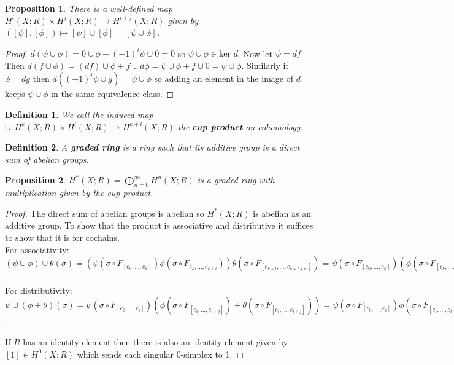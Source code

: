 \documentclass{report}
\newtheorem{definition}{Definition}
\newtheorem{proposition}{Proposition}
\begin{document}
\begin{proposition}
There is a well-defined map $H^i(X;R)\times H^j(X;R)\to H^{i+j}(X;R)$ given by $([\psi],[\phi])\mapsto [\psi]\cup [\phi]=[\psi\cup\phi]$.
\end{proposition}
\begin{proof}
$d(\psi\cup\phi)=0\cup\phi+(-1)^i\psi\cup 0=0$ so $\psi\cup\phi \in \text{ker }d$.
Now let $\psi=df$. Then $d(f\cup\phi)=(df)\cup\phi\pm f\cup d\phi=\psi\cup\phi+f\cup0=\psi\cup\phi$. Similarly if $\phi=dg$ then $d((-1)^i\psi\cup g)=\psi\cup\phi$ so adding an element in the image of $d$ keeps $\psi\cup\phi$ in the same equivalence class.
\end{proof}

\begin{definition}
We call the induced map $\cup:H^k(X;R)\times H^l(X;R)\to H^{k+l}(X;R)$ the \textbf{cup product} on cohomology.
\end{definition}

\begin{definition}
A \textbf{graded ring} is a ring such that its additive group is a direct sum of abelian groups.
\end{definition}

\begin{proposition}
$H^*(X;R)=\bigoplus_{n=0}^\infty H^n(X;R)$ is a graded ring with multiplication given by the cup product.
\end{proposition}
\begin{proof}
The direct sum of abelian groups is abelian so $H^*(X;R)$ is abelian as an additive group.
To show that the product is associative and distributive it suffices to show that it is for cochains.\\
For associativity:
$(\psi\cup\phi)\cup\theta(\sigma)=(\psi(\sigma\circ F_{[e_0,...,e_k]})\phi(\sigma\circ F_{e_k,...,e_{k+l}}))\theta(\sigma\circ F_{[e_{k+l},...,e_{k+l+m}]})=\psi(\sigma\circ F_{[e_0,...,e_k]})(\phi(\sigma\circ F_{[e_k,...,e_{k+l}]})\theta(\sigma\circ F_{[e_{k+l},...,e_{k+l+m}]}))=(\psi\cup\phi)\cup\theta(\sigma)$.\\
For distributivity:
$\psi\cup(\phi+\theta)(\sigma)=\psi(\sigma\circ F_{[e_0,...,e_i]})(\phi(\sigma\circ F_{[e_i,...,e_{i+j}]})+\theta(\sigma\circ F_{[e_i,...,e_{i+j}]}))=\psi(\sigma\circ F_{[e_0,...,e_i]})\phi(\sigma\circ F_{[e_i,...,e_{i+j}]})+\psi(\sigma\circ F_{[e_0,...,e_i]})\theta(\sigma\circ F_{[e_i,...,e_{i+j}]})=\psi\cup\phi(\sigma)+\psi\cup\theta(\sigma)$.


\noindent If $R$ has an identity element then there is also an identity element given by $[1]\in H^0(X;R)$ which sends each singular 0-simplex to 1.
\end{proof}
\end{document}
